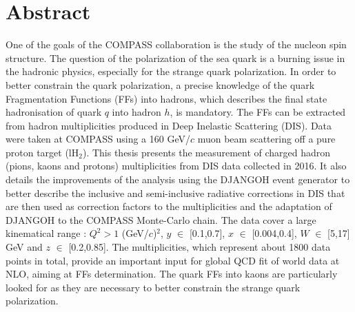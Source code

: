 


\begingroup
\let\clearpage\relax
\let\cleardoublepage\relax
\let\cleardoublepage\relax

\chapter*{Abstract}

One of the goals of the COMPASS collaboration is the study of the nucleon spin structure. The question of the polarization of the sea quark is a burning issue in the hadronic physics, especially for the strange quark polarization. In order to better constrain the quark polarization, a precise knowledge of the quark Fragmentation Functions (FFs) into hadrons, which describes the final state hadronisation of quark $q$ into hadron $h$, is mandatory. The FFs can be extracted from hadron multiplicities produced in Deep Inelastic Scattering (DIS). Data were taken at COMPASS using a 160 GeV/$c$ muon beam scattering off a pure proton target (lH$_2$). This thesis presents the measurement of charged hadron (pions, kaons and protons) multiplicities from DIS data collected in 2016. It also details the improvements of the analysis using the DJANGOH event generator to better describe the inclusive and semi-inclusive radiative corrections in DIS that are then used as correction factors to the multiplicities and the adaptation of DJANGOH to the COMPASS Monte-Carlo chain. The data cover a large kinematical range : $Q^2 > 1$ (GeV/$c$)$^2$, $y$ $\in$ [0.1,0.7], $x$ $\in$ [0.004,0.4], $W$ $\in$ [5,17] GeV and $z$ $\in$ [0.2,0.85]. The multiplicities, which represent about 1800 data points in total, provide an important input for global QCD fit of world data at NLO, aiming at FFs determination. The quark FFs into kaons are particularly looked for as they are necessary to better constrain the strange quark polarization.

\vspace{2cm}

